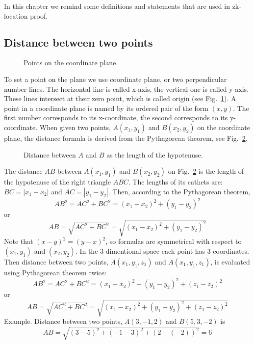 \documentclass{article}
\begin{document}
In this chapter we remind some definitions and statements that are used in zk-location proof.

\subsection{Distance between two points}  %

\begin{figure}
  \centering
  \def\svgwidth{200bp}
  
\caption{Points on the coordinate plane.}
\label{fig-2}
\end{figure}
%
To set a point on the plane we use coordinate plane, or two perpendicular number lines.
The horizontal line is called x-axis, the vertical one is called y-axis.
These lines intersect at their zero point, which is called origin (see Fig.~\ref{fig-2}).
A point in a coordinate plane is named by its ordered pair of the form $(x, y)$.
The first number corresponds to its x-coordinate, the second corresponds to its y-coordinate.
When given two points, $A(x_1, y_1)$ and $B(x_2, y_2)$ on the coordinate plane, the distance formula is derived from the Pythagorean theorem, see Fig.~\ref{fig-3}.
\begin{figure}
  \centering
  \def\svgwidth{200bp}
  
\caption{Distance between $A$ and $B$ as the length of the hypotenuse.}
\label{fig-3}
\end{figure}
%
The distance $AB$ between $A(x_1, y_1)$ and $B(x_2, y_2)$ on Fig.~\ref{fig-3} is the length of the hypotenuse of the right triangle $ABC$.
The lengths of its cathets are: $BC = |x_1 - x_2|$ and $AC = |y_1 - y_2|$.
 Then, according to the Pythagorean theorem,
\begin{equation}
  AB^2 = AC^2 + BC^2 = (x_1 - x_2)^2 + (y_1 - y_2)^2
\end{equation}
or
\begin{equation}
  AB = \sqrt{AC^2 + BC^2} = \sqrt{(x_1 - x_2)^2 + (y_1 - y_2)^2}
\end{equation}
Note that $(x - y)^2 = (y - x)^2$, so formulas are symmetrical with respect to $(x_1, y_1)$ and $(x_2, y_2)$.
In the 3-dimentional space each point has 3 coordinates.
Then distance between two points, $A(x_1, y_1, z_1)$ and $A(x_1, y_1, z_1)$, is evaluated using Pythagorean theorem twice:
\begin{equation}
  AB^2 = AC^2 + BC^2 = (x_1 - x_2)^2 + (y_1 - y_2)^2 + (z_1 - z_2)^2
\end{equation}
or
\begin{equation}
  AB = \sqrt{AC^2 + BC^2} = \sqrt{(x_1 - x_2)^2 + (y_1 - y_2)^2 + (z_1 - z_2)^2}
\end{equation}
Example.
Distance between two points, $A(3, -1, 2)$ and $B(5, 3, -2)$ is
\begin{equation}
  AB = \sqrt{(3 - 5)^2 + (-1 - 3)^2 + (2 - (-2))^2} = 6
\end{equation}
\end{document}
